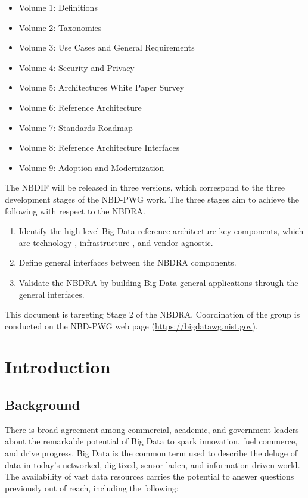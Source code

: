 \documentclass[9pt,]{article}
\providecommand{\tightlist}{%
  \setlength{\itemsep}{0pt}\setlength{\parskip}{0pt}}
\begin{document}
\begin{itemize}
\tightlist
\item
  Volume 1: Definitions
\item
  Volume 2: Taxonomies
\item
  Volume 3: Use Cases and General Requirements
\item
  Volume 4: Security and Privacy
\item
  Volume 5: Architectures White Paper Survey
\item
  Volume 6: Reference Architecture
\item
  Volume 7: Standards Roadmap
\item
  Volume 8: Reference Architecture Interfaces
\item
  Volume 9: Adoption and Modernization
\end{itemize}

The NBDIF will be released in three versions, which correspond to the
three development stages of the NBD-PWG work. The three stages aim to
achieve the following with respect to the NBDRA.

\begin{enumerate}
\def\labelenumi{\arabic{enumi}.}
\tightlist
\item
  Identify the high-level Big Data reference architecture key
  components, which are technology-, infrastructure-, and
  vendor-agnostic.
\item
  Define general interfaces between the NBDRA components.
\item
  Validate the NBDRA by building Big Data general applications through
  the general interfaces.
\end{enumerate}

This document is targeting Stage 2 of the NBDRA. Coordination of the
group is conducted on the NBD-PWG web page
(\url{https://bigdatawg.nist.gov}).

\hypertarget{introduction}{%
\section{Introduction}\label{introduction}}

\hypertarget{background}{%
\subsection{Background}\label{background}}

There is broad agreement among commercial, academic, and government
leaders about the remarkable potential of Big Data to spark innovation,
fuel commerce, and drive progress. Big Data is the common term used to
describe the deluge of data in today's networked, digitized,
sensor-laden, and information-driven world. The availability of vast
data resources carries the potential to answer questions previously out
of reach, including the following:
\end{document}
